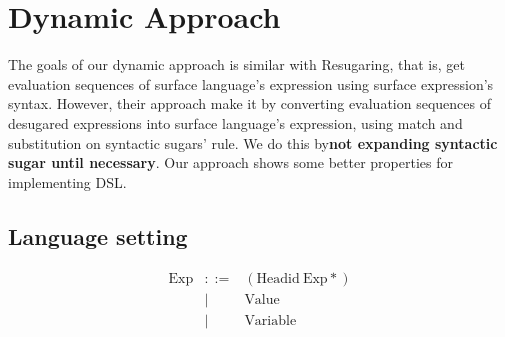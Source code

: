 \section{Dynamic Approach}

The goals of our dynamic approach is similar with Resugaring\cite{resugaring}\cite{hygienic}, that is, get evaluation sequences of surface language's expression using surface expression's syntax. However, their approach make it by converting evaluation sequences of desugared expressions into surface language's expression, using match and substitution on syntactic sugars' rule. We do this by{\bfseries not expanding syntactic sugar until necessary}. Our approach shows some better properties for implementing DSL.

\subsection{Language setting}

\[
\begin{array}{rcl}
\mbox{Exp} &::=& (\mbox{Headid}~\mbox{Exp}*)\\
&|& \mbox{Value}\\
&|& \mbox{Variable}
\end{array}
\]

\begin{center}
	\framebox[35em][l]{
		\parbox[t]{35em}{
			\[
			\begin{array}{rcl}
			\mbox{Exp} &::=& \mbox{Coreexp}\\
			&|& \mbox{Surfexp}\\
			&|& \mbox{Commonexp}\\
			&|& \mbox{OtherSurfexp}\\
			&|& \mbox{OtherCommonexp}
			\end{array}
			\]
			
			\[
			\begin{array}{rcl}
			\mbox{Coreexp} &::=& (\mbox{CoreHead}~\mbox{Exp}*)
			\end{array}
			\]
			
			\[
			\begin{array}{rcl}
			\mbox{Surfexp} &::=& (\mbox{SurfHead}~(\mbox{Surfexp}~|~\mbox{Commonexp})*)
			\end{array}
			\]
			
			\[
			\begin{array}{rcl}
			\mbox{Commonexp} &::=& (\mbox{CommonHead}~(\mbox{Surfexp}~|~\mbox{Commonexp})*)\\
			&|& \mbox{Value}\\
			&|& \mbox{Variable}
			\end{array}
			\]
			
			\[
			\begin{array}{rcl}
			\mbox{OtherSurfexp} &::=& (\mbox{SurfHead}~\mbox{Exp}*~\mbox{Coreexp}~\mbox{Exp}*)
			\end{array}
			\]
			
			\[
			\begin{array}{rcl}
			\mbox{OtherCommonexp} &::=& (\mbox{CommonHead}~\mbox{Exp}*~\mbox{Coreexp}~\mbox{Exp}*)
			\end{array}
			\]
		}
	}
\end{center}

